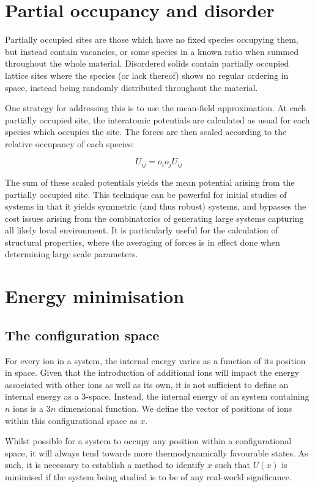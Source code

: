 \section{Partial occupancy and disorder}
Partially occupied sites are those which have no fixed species occupying them, but instead contain vacancies, or some species in a known ratio when summed throughout the whole material.
Disordered solids contain partially occupied lattice sites where the species (or lack thereof) shows no regular ordering in space, instead being randomly distributed throughout the material.



One strategy for addressing this is to use the mean-field approximation. 
At each partially occupied site, the interatomic potentials are calculated as usual for each species which occupies the site. 
The forces are then scaled according to the relative occupancy of each species:

$$
U_{ij} = o_io_jU_{ij}
$$

The sum of these scaled potentials yields the mean potential arising from the partially occupied site.
This technique can be powerful for initial studies of systems in that it yields symmetric (and thus robust) systems, and bypasses the cost issues arising from the combinatorics of generating large systems capturing all likely local environment.
It is particularly useful for the calculation of structural properties, where the averaging of forces is in effect done when determining large scale parameters.

\section{Energy minimisation}
\label{sec:minimization}
\subsection{The configuration space}
For every ion in a system, the internal energy varies as a function of its position in space.
Given that the introduction of additional ions will impact the energy associated with other ions as well as its own, it is not sufficient to define an internal energy as a 3-space.
Instead, the internal energy of an system containing $n$ ions is a $3n$ dimensional function.
We define the vector of positions of ions within this configurational space as $x$.

Whilst possible for a system to occupy any position within a configurational space, it will always tend towards more thermodynamically favourable states.
As such, it is necessary to establish a method to identify $x$ such that $U(x)$ is minimised if the system being studied is to be of any real-world significance.


